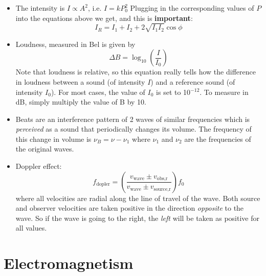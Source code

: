 \documentclass{scrartcl}
\begin{document}
\begin{itemize}
        \item The intensity is $I\propto A^2$, i.e. $I=kP_0^2$ Plugging in the corresponding values of $P$ into the equations above we get, and this is \textbf{important}: \[\boxed{I_R=I_1+I_2+2\sqrt{I_1I_2}\cos\phi}\]
        \item Loudness, measured in Bel is given by \[\Delta B=\log_{10}\left(\frac I{I_0}\right)\] Note that loudness is relative, so this equation really tells how the difference in loudness between a sound (of intensity $I$) and a reference sound (of intensity $I_0$). For most cases, the value of $I_0$ is set to 10$^{-12}$. To measure in dB, simply multiply the value of B by 10.
        \item Beats are an interference pattern of 2 waves of similar frequencies which is \textit{perceived} as a sound that periodically changes its volume. The frequency of this change in volume is $\boxed{\nu_B=\nu-\nu_1}$ where $\nu_1$ and $\nu_2$ are the frequencies of the original waves.
        \item Doppler effect: \[\boxed{f_\text{dopler}=\left(\frac{v_\text{wave}\pm v_\text{obs,r}}{v_\text{wave}\pm v_\text{source,r}}\right)f_0}\] where all velocities are radial along the line of travel of the wave. Both source and observer velocities are taken positive in the direction \textit{opposite} to the wave. So if the wave is going to the right, the \textit{left} will be taken as positive for all values.
    \end{itemize}
    \section{Electromagnetism}
\end{document}
